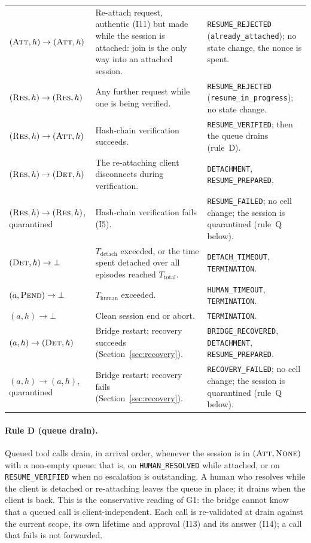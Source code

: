 \begin{table}[htbp]
\begin{tabularx}{\columnwidth}{l X X}
$(\textsc{Att},h) \to (\textsc{Att},h)$ & Re-attach request, authentic
(I11) but made while the session is attached: join is the only way into an
attached session. & \texttt{RESUME\_REJECTED} (\texttt{already\_attached});
no state change, the nonce is spent. \\
$(\textsc{Res},h) \to (\textsc{Res},h)$ & Any further request while one is
being verified. & \texttt{RESUME\_REJECTED} (\texttt{resume\_in\_progress});
no state change. \\
$(\textsc{Res},h) \to (\textsc{Att},h)$ & Hash-chain verification
succeeds. & \texttt{RESUME\_VERIFIED}; then the queue drains (rule~D). \\
$(\textsc{Res},h) \to (\textsc{Det},h)$ & The re-attaching client
disconnects during verification. & \texttt{DETACHMENT}, \texttt{RESUME\_PREPARED}. \\
$(\textsc{Res},h) \to (\textsc{Res},h)$, quarantined & Hash-chain
verification fails (I5). & \texttt{RESUME\_FAILED}; no cell change; the
session is quarantined (rule~Q below). \\
$(\textsc{Det},h) \to \bot$ & $T_{\text{detach}}$ exceeded, or the time
spent detached over all episodes reached $T_{\text{total}}$. &
\texttt{DETACH\_TIMEOUT}, \texttt{TERMINATION}. \\
$(a,\textsc{Pend}) \to \bot$ & $T_{\text{human}}$ exceeded. &
\texttt{HUMAN\_TIMEOUT}, \texttt{TERMINATION}. \\
$(a,h) \to \bot$ & Clean session end or abort. & \texttt{TERMINATION}. \\
$(a,h) \to (\textsc{Det},h)$ & Bridge restart; recovery succeeds
(Section~\ref{sec:recovery}). & \texttt{BRIDGE\_RECOVERED},
\texttt{DETACHMENT}, \texttt{RESUME\_PREPARED}. \\
$(a,h) \to (a,h)$, quarantined & Bridge restart; recovery fails
(Section~\ref{sec:recovery}). & \texttt{RECOVERY\_FAILED}; no cell
change; the session is quarantined (rule~Q below). \\
\bottomrule
\end{tabularx}
\end{table}

\paragraph{Rule D (queue drain).} Queued tool calls drain, in arrival
order, whenever the session is in $(\textsc{Att},\textsc{None})$ with a
non-empty queue: that is, on \texttt{HUMAN\_RESOLVED} while attached, or
on \texttt{RESUME\_VERIFIED} when no escalation is outstanding. A human
who resolves while the client is detached or re-attaching leaves the
queue in place; it drains when the client is back. This is the
conservative reading of G1: the bridge cannot know that a queued call
is client-independent. Each call is re-validated at drain against the current scope, its own
lifetime and approval (I13) and its answer (I14); a call that fails is
not forwarded.

